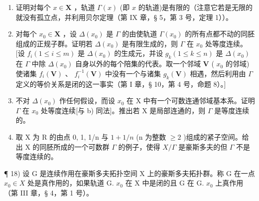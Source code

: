 \begin{enumerate}
\def\labelenumi{\alph{enumi})}
\item
  证明对每个 \(x \in \mathbf{X}\) ，轨道 \(\Gamma(x)\) (即 \(x\) 的轨道)是有限的（注意它若是无限的就没有孤立点，并利用贝尔定理（第 IX 章，§ 5，第 3 号，定理 1））。
\item
  对每个 \(x_0 \in \mathbf{X}\) ，设 \(\Delta(x_0)\) 是 \(\Gamma\) 的由使轨道 \(\Gamma(x_0)\) 的所有点都不动的同胚组成的正规子群。证明若 \(\Delta(x_0)\) 是有限生成的，则 \(\Gamma\) 在 \(x_0\) 处等度连续。{[}设 \(f_i (1 \leqslant i \leqslant m)\) 是 \(\Delta(x_0)\) 的生成元，并设 \(g_k (1 \leqslant k \leqslant n)\) 是 \(\Delta(x_0)\) 在 \(\Gamma\) 中除 \(\Delta(x_0)\) 自身以外的每个陪集的代表。取一个邻域 \(\mathbf{V}\) ( \(x_0\) 的邻域)使诸集 \(f_i(\mathbf{V})\) 、 \(f_i^{-1}(\mathbf{V})\) 中没有一个与诸集 \(g_k(\mathbf{V})\) 相遇，然后利用由 \(\Gamma\) 定义的等价关系是闭的这一事实（第 I 章，§ 10，第 4 号，命题 8）。{]}
\item
  不对 \(\Delta(x_{0})\) 作任何假设，而设 \(x_{0}\) 在 X 中有一个可数连通邻域基本系。证明 \(\Gamma\) 在 \(x_{0}\) 处等度连续{[}与 b) 同法{]}。推出若 X 是局部连通的，则 \(\Gamma\) 是等度连续的。
\item
  取 X 为 R 的由点 0, 1, 1/n 与 \(1 + 1/n\) (n 为整数 \(\geqslant 2\) )组成的紧子空间。给出 X 的同胚所成的一个可数群 \(\Gamma\) 的例子，使得 \(X/\Gamma\) 是豪斯多夫的但 \(\Gamma\) 不是等度连续的。
\end{enumerate}

¶ 18) 设 G 是连续作用在豪斯多夫拓扑空间 X 上的豪斯多夫拓扑群。称 G 在一点 \(x_{0} \in X\) 处是真作用的，如果轨道 G. \(x_{0}\) 在 X 中是闭的且 G 在 G. \(x_{0}\) 上真作用（第 III 章，§ 4，第 1 号）。

